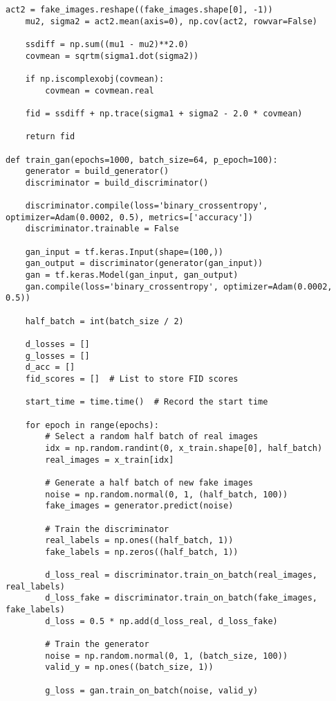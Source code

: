 \begin{lstlisting}[style=mypython, caption=GAN model with dense layers]
    act2 = fake_images.reshape((fake_images.shape[0], -1))
    mu2, sigma2 = act2.mean(axis=0), np.cov(act2, rowvar=False)
    
    ssdiff = np.sum((mu1 - mu2)**2.0)
    covmean = sqrtm(sigma1.dot(sigma2))
    
    if np.iscomplexobj(covmean):
        covmean = covmean.real
    
    fid = ssdiff + np.trace(sigma1 + sigma2 - 2.0 * covmean)
    
    return fid

def train_gan(epochs=1000, batch_size=64, p_epoch=100):
    generator = build_generator()
    discriminator = build_discriminator()

    discriminator.compile(loss='binary_crossentropy', optimizer=Adam(0.0002, 0.5), metrics=['accuracy'])
    discriminator.trainable = False

    gan_input = tf.keras.Input(shape=(100,))
    gan_output = discriminator(generator(gan_input))
    gan = tf.keras.Model(gan_input, gan_output)
    gan.compile(loss='binary_crossentropy', optimizer=Adam(0.0002, 0.5))

    half_batch = int(batch_size / 2)
    
    d_losses = []
    g_losses = []
    d_acc = []
    fid_scores = []  # List to store FID scores
    
    start_time = time.time()  # Record the start time

    for epoch in range(epochs):
        # Select a random half batch of real images
        idx = np.random.randint(0, x_train.shape[0], half_batch)
        real_images = x_train[idx]

        # Generate a half batch of new fake images
        noise = np.random.normal(0, 1, (half_batch, 100))
        fake_images = generator.predict(noise)

        # Train the discriminator
        real_labels = np.ones((half_batch, 1))
        fake_labels = np.zeros((half_batch, 1))

        d_loss_real = discriminator.train_on_batch(real_images, real_labels)
        d_loss_fake = discriminator.train_on_batch(fake_images, fake_labels)
        d_loss = 0.5 * np.add(d_loss_real, d_loss_fake)

        # Train the generator
        noise = np.random.normal(0, 1, (batch_size, 100))
        valid_y = np.ones((batch_size, 1))

        g_loss = gan.train_on_batch(noise, valid_y)


\end{lstlisting}

